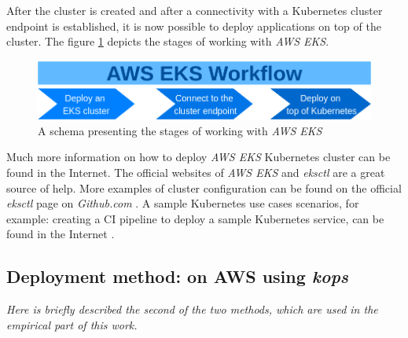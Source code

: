 After the cluster is created and after a connectivity with a Kubernetes cluster endpoint is established, it is now possible to deploy applications on top of the cluster. The figure \ref{fig:eks-w} depicts the stages of working with \textit{AWS EKS}.
\begin{figure}[H]
    \centering
    \includegraphics[width=12cm]{figures/eks-workflow.png}
    \captionsetup{justification=centering,margin=2cm,width=1.2\linewidth}
    \caption{A schema presenting the stages of working with \textit{AWS EKS}}
    \label{fig:eks-w}
\end{figure}

Much more information on how to deploy \textit{AWS EKS} Kubernetes cluster can be found in the Internet. The official websites of \textit{AWS EKS} \cite{what-is-eks} and \textit{eksctl} \cite{eksctl} are a great source of help. More examples of cluster configuration can be found on the official \textit{eksctl} page on \textit{Github.com} \cite{eks-gh}. A sample Kubernetes use cases scenarios, for example: creating a CI pipeline to deploy a sample Kubernetes service, can be found in the Internet \cite{eksworkshop}.


\subsection{Deployment method: on AWS using \textit{kops}}
\textit{Here is briefly described the second of the two methods, which are used in the empirical part of this work.}
\\

